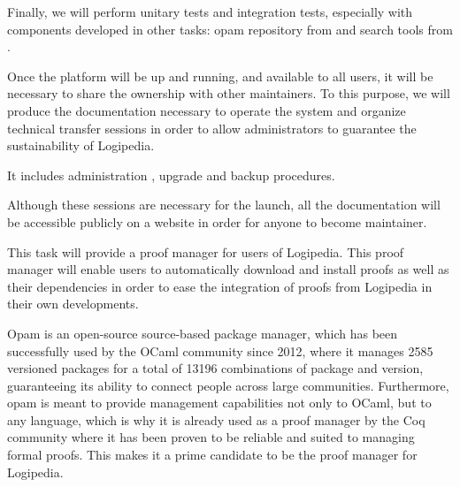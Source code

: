 \begin{workpackage}[id=access,wphases=0-48,type=MGT,
  short=Access,%
  title={Access to the infrastructure},
  lead=Irt,IrtRM=23,OcaRM=6,EduRM=12,InrRM=18]
\begin{tasklist}
\begin{task}[id=web,
      title=Giving access to the infrastructure on the world-wide web,
      lead=Irt,IrtRM=18]
    Finally, we will perform unitary tests and integration tests,
    especially with components developed in other tasks: opam
    repository from  and search tools from
    .
  \end{task}

  \begin{task}[id=transfer,
      title=Transfer for the sustainability of the system,
      lead=Irt,IrtRM=1]
    Once the platform will be up and running, and available to all
    users, it will be necessary to share the ownership with other
    maintainers. To this purpose, we will produce the documentation
    necessary to operate the system and organize technical transfer
    sessions in order to allow administrators to guarantee the
    sustainability of Logipedia.

    It includes administration , upgrade and backup procedures.

    Although these sessions are necessary for the launch, all the
    documentation will be accessible publicly on a website in order
    for anyone to become maintainer.
  \end{task}

  \begin{task}[id=opam,
      title=Giving access to the infrastructure in proof tools,
      lead=Oca,
      OcaRM=6]
    This task will provide a proof manager for users of Logipedia. This proof
    manager will enable users to automatically download and install
    proofs as well as their dependencies in order to ease the
    integration of proofs from Logipedia in their own developments.

    Opam \cite{OPAM} is an open-source source-based package manager,
    which has been successfully used by the OCaml community since
    2012, where it manages 2585 versioned packages for a total of
    13196 combinations of package and version, guaranteeing its
    ability to connect people across large communities. Furthermore,
    opam is meant to provide management capabilities not only to
    OCaml, but to any language, which is why it is already used as a
    proof manager by the Coq community where it has been proven to be
    reliable and suited to managing formal proofs. This makes it a
    prime candidate to be the proof manager for Logipedia.


\end{task}
\end{tasklist}
\end{workpackage}
